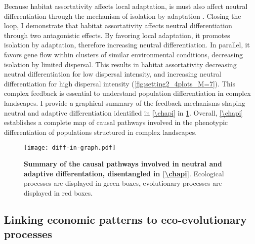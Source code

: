 Because habitat assortativity affects local adaptation, is must also affect neutral differentiation through the mechanism of isolation by adaptation \citep{Orsini2013}. Closing the loop, I demonstrate that habitat assortativity affects neutral differentiation through two antagonistic effects. By favoring local adaptation, it promotes isolation by adaptation, therefore increasing neutral differentiation. In parallel, it favors gene flow within clusters of similar environmental conditions, decreasing isolation by limited dispersal. This results in habitat assortativity decreasing neutral differentiation for low dispersal intensity, and increasing neutral differentiation for high dispersal intensity (\cref{fig:setting2_4plots_M=7}).
% 
This complex feedback is essential to understand population differentiation in complex landscapes.
% 
I provide a graphical summary of the feedback mechanisms shaping neutral and adaptive differentiation identified in \cref{\chapi} in \cref{fig:summary_diff-in-graph}. Overall, \cref{\chapi} establishes a complete map of causal pathways involved in the phenotypic differentiation of populations structured in complex landscapes. %

\begin{figure}[t]
    \centering
    \texttt{[image: diff-in-graph.pdf]}
    \caption{\textbf{Summary of the causal pathways involved in neutral and adaptive differentation, disentangled in \cref{\chapi}}. Ecological processes are displayed in green boxes, evolutionary processes are displayed in red boxes.}
    \label{fig:summary_diff-in-graph}
\end{figure}


\subsection{Linking economic patterns to eco-evolutionary processes}

